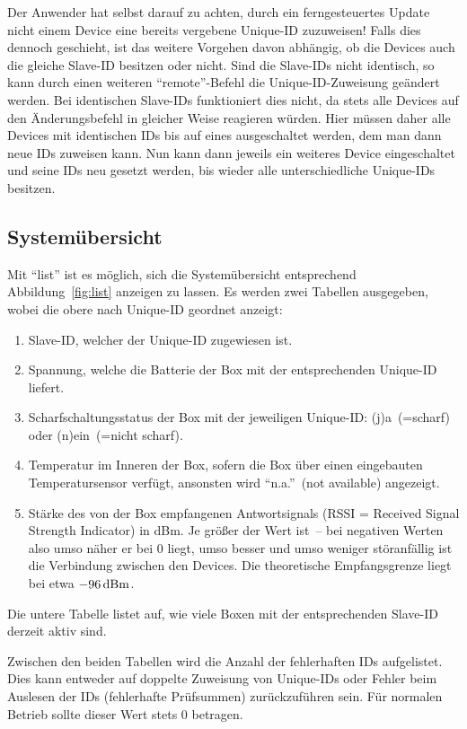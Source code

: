 \documentclass[pdftex, parskip, numbers=noenddot, toc=listof]{scrbook}
\begin{document}
	Der Anwender hat selbst darauf zu achten, durch ein ferngesteuertes Update nicht einem Device eine bereits vergebene Unique-ID zuzuweisen! Falls dies dennoch geschieht, ist das weitere Vorgehen davon abhängig, ob die Devices auch die gleiche Slave-ID besitzen oder nicht. Sind die Slave-IDs nicht identisch, so kann durch einen weiteren \enquote{remote}-Befehl die Unique-ID-Zuweisung geändert werden. Bei identischen Slave-IDs funktioniert dies nicht, da stets alle Devices auf den Änderungsbefehl in gleicher Weise reagieren würden. Hier müssen daher alle Devices mit identischen IDs bis auf eines ausgeschaltet werden, dem man dann neue IDs zuweisen kann. Nun kann dann jeweils ein weiteres Device eingeschaltet und seine IDs neu gesetzt werden, bis wieder alle unterschiedliche Unique-IDs besitzen.

	\subsection{Systemübersicht}
	\label{sec:list}

	Mit \enquote{list} ist es möglich, sich die Systemübersicht entsprechend Abbildung~\ref{fig:list} anzeigen zu lassen. Es werden zwei Tabellen ausgegeben, wobei die obere nach Unique-ID geordnet anzeigt:
	\begin{enumerate}
		\item Slave-ID, welcher der Unique-ID zugewiesen ist.
		\item Spannung, welche die Batterie der Box mit der entsprechenden Unique-ID liefert.
		\item Scharfschaltungsstatus der Box mit der jeweiligen Unique-ID: (j)a~(=scharf) oder (n)ein~(=nicht scharf).
		\item Temperatur im Inneren der Box, sofern die Box über einen eingebauten Temperatursensor verfügt, ansonsten wird \enquote{n.a.}~(not available) angezeigt.
		\item Stärke des von der Box empfangenen Antwortsignals (RSSI = Received Signal Strength Indicator) in dBm. Je größer der Wert ist~-- bei negativen Werten also umso näher er bei 0 liegt, umso besser und umso weniger störanfällig ist die Verbindung zwischen den Devices. Die theoretische Empfangsgrenze liegt bei etwa $\unit[-96]{dBm}$.
	\end{enumerate}

	Die untere Tabelle listet auf, wie viele Boxen mit der entsprechenden Slave-ID derzeit aktiv sind.

	Zwischen den beiden Tabellen wird die Anzahl der fehlerhaften IDs aufgelistet. Dies kann entweder auf doppelte Zuweisung von Unique-IDs oder Fehler beim Auslesen der IDs (fehlerhafte Prüfsummen) zurückzuführen sein. Für normalen Betrieb sollte dieser Wert stets 0 betragen.
\end{document}
